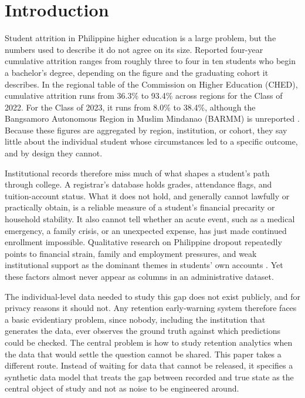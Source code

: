 \documentclass[11pt]{article}
\begin{document}
\FloatBarrier
\section{Introduction}
\label{sec:intro}

\hspace*{\parindent}Student attrition in Philippine higher education is a large problem, but the numbers used to describe it do not agree on its size. Reported four-year cumulative attrition ranges from roughly three to four in ten students who begin a bachelor's degree, depending on the figure and the graduating cohort it describes. In the regional table of the Commission on Higher Education (CHED), cumulative attrition runs from 36.3\% to 93.4\% across regions for the Class of 2022. For the Class of 2023, it runs from 8.0\% to 38.4\%, although the Bangsamoro Autonomous Region in Muslim Mindanao (BARMM) is unreported \citep{cpbrd2026}. Because these figures are aggregated by region, institution, or cohort, they say little about the individual student whose circumstances led to a specific outcome, and by design they cannot.

Institutional records therefore miss much of what shapes a student's path through college. A registrar's database holds grades, attendance flags, and tuition-account status. What it does not hold, and generally cannot lawfully or practically obtain, is a reliable measure of a student's financial precarity or household stability. It also cannot tell whether an acute event, such as a medical emergency, a family crisis, or an unexpected expense, has just made continued enrollment impossible. Qualitative research on Philippine dropout repeatedly points to financial strain, family and employment pressures, and weak institutional support as the dominant themes in students' own accounts \citep{cahilog2025,socioeconomic2024}. Yet these factors almost never appear as columns in an administrative dataset.

The individual-level data needed to study this gap does not exist publicly, and for privacy reasons it should not. Any retention early-warning system therefore faces a basic evidentiary problem, since nobody, including the institution that generates the data, ever observes the ground truth against which predictions could be checked. The central problem is how to study retention analytics when the data that would settle the question cannot be shared. This paper takes a different route. Instead of waiting for data that cannot be released, it specifies a synthetic data model that treats the gap between recorded and true state as the central object of study and not as noise to be engineered around.
\end{document}
